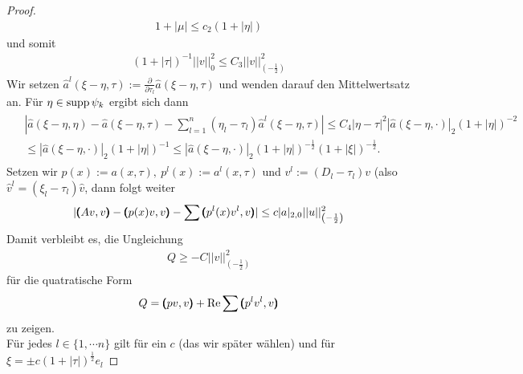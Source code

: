 \begin{proof}
\begin{align}
	1+| \mu| \le c_2\left(1+|\eta|\right)
\end{align}
und somit
\begin{align}\label{Abschaetzung 0-Norm}
	\left(1+|\tau|\right)^{-1}|| v||_0^2 \le C_3|| v||_{\left(-\frac{1}{2}\right)}^2
\end{align}
Wir setzen $\widehat{a}^l(\xi-\eta,\tau):=\frac{\partial}{\partial \tau_l}\widehat{a}(\xi-\eta,\tau)$ und wenden darauf den Mittelwertsatz an. Für $\eta\in \operatorname{supp} \psi_k$ ergibt sich dann
\begin{align}
\begin{split}	&| \widehat{a}(\xi-\eta,\eta)-\widehat{a}(\xi-\eta,\tau) -\sum\limits_{l=1}^n (\eta_l-\tau_l)\widehat{a}^l\left(\xi-\eta,\tau\right)| \le C_4| \eta-\tau|^2| \widehat{a}(\xi-\eta,\cdot)|_2\left(1+|\eta|\right)^{-2} \\&
\le | \widehat{a}(\xi-\eta,\cdot)|_2 \left(1+|\eta|\right)^{-1} \le| \widehat{a}(\xi-\eta,\cdot)|_2\left(1+|\eta|\right)^{-\frac{1}{2}}\left(1+|\xi|\right)^{-\frac{1}{2}}.
\end{split}
\end{align}
Setzen wir $p(x):=a(x,\tau),\ p^l(x):= a^l(x,\tau) $ und $v^l:=(D_l-\tau_l)v$ (also $\widehat{v}^l=\left(\xi_l-\tau_l\right)\widehat{v}$, dann folgt weiter
\begin{align}
	|\pmb(Av,v\pmb)-\pmb(p(x)v,v\pmb)-\sum\pmb(p^l(x)v^l,v\pmb)| \le c | a|_{2,0}|| u||_{\left(-\frac{1}{2}\right)}^2
\end{align}
Damit verbleibt es, die Ungleichung \begin{align}
	Q \ge -C|| v||_{\left(-\frac{1}{2}\right)}^2
\end{align}
für die quatratische Form
\begin{align}
	Q=\pmb(pv,v\pmb)+\operatorname{Re}\sum\pmb(p^lv^l,v\pmb) 
\end{align}
zu zeigen.\\
Für jedes $l\in\{1,\cdots n\}$ gilt für ein $c$ (das wir später wählen) und für $\xi = \pm c(1+| \tau|)^{\frac{1}{2}}e_l$


\end{proof}
